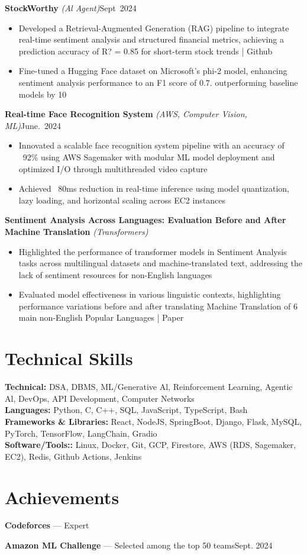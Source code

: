 \documentclass[10pt,letterpaper]{article}
\newcommand{\projectHeading}[3]{%
  \par\noindent\textbf{#1} \textit{(#2)}\hfill\mbox{#3}\par
}
\begin{document}
\projectHeading{StockWorthy}{Al Agent}{Sept 2024}
\begin{itemize}
\item Developed a Retrieval-Augmented Generation (RAG) pipeline to integrate real-time sentiment analysis and structured financial
metrics, achieving a prediction accuracy of R? = 0.85 for short-term stock trends | Github
\item Fine-tuned a Hugging Face dataset on Microsoft's phi-2 model, enhancing sentiment analysis performance to an F1 score of 0.7. outperforming baseline models by 10%
\end{itemize}

\projectHeading{Real-time Face Recognition System}{AWS, Computer Vision, ML}{June. 2024}
\begin{itemize}
\item Innovated a scalable face recognition system pipeline with an accuracy of ~92\% using AWS Sagemaker with modular ML model deployment and optimized I/O through multithreaded video capture
\item Achieved ~80ms reduction in real-time inference using model quantization, lazy loading, and horizontal scaling across EC2 instances
\end{itemize}

\projectHeading{Sentiment Analysis Across Languages: Evaluation Before and After Machine Translation}{Transformers}{}
\begin{itemize}
\item Highlighted the performance of transformer models in Sentiment Analysis tasks across multilingual datasets and machine-translated text, addressing the lack of sentiment resources for non-English languages
\item Evaluated model effectiveness in various linguistic contexts, highlighting performance variations before and after translating Machine Translation of 6 main non-English Popular Languages | Paper
\end{itemize}

\section{Technical Skills}
\textbf{Technical:} DSA, DBMS, ML/Generative Al, Reinforcement Learning, Agentic Al, DevOps, API Development, Computer Networks \\[-1pt]
\textbf{Languages:} Python, C, C++, SQL, JavaScript, TypeScript, Bash\\[-1pt]
\textbf{Frameworks \& Libraries:} React, NodeJS, SpringBoot, Django, Flask, MySQL, PyTorch, TensorFlow, LangChain, Gradio\\[-1pt]
\textbf{Software/Tools::} Linux, Docker, Git, GCP, Firestore, AWS (RDS, Sagemaker, EC2), Redis, Github Actions, Jenkins\\[-1pt]

\section{Achievements}
\textbf{Codeforces} --- Expert \par
\textbf{Amazon ML Challenge} --- Selected among the top 50 teams\hfill Sept. 2024\par
\end{document}

